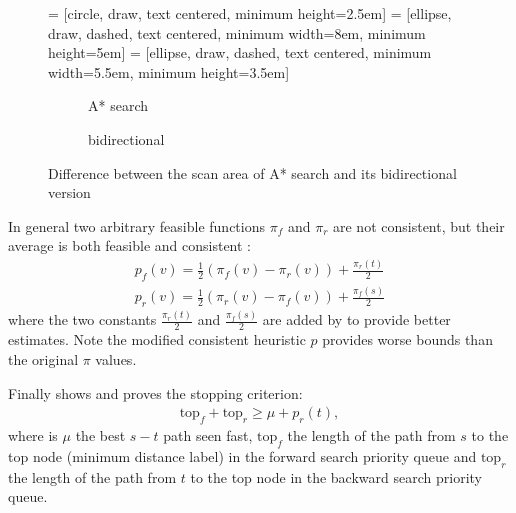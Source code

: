 \begin{figure}
     = [circle, draw, text centered, minimum height=2.5em]
     = [ellipse, draw, dashed, text centered, minimum width=8em, minimum height=5em]
     = [ellipse, draw, dashed, text centered, minimum width=5.5em, minimum height=3.5em]
    \centering
    \begin{subfigure}[t]{.4\textwidth}
        \centering
        \caption{A* search}
    \end{subfigure}
    \begin{subfigure}[t]{.4\textwidth}
        \centering
        \caption{bidirectional}
    \end{subfigure}
    \caption{Difference between the scan area of A* search and its bidirectional version}
    \label{fig:bidirectdiff}
\end{figure}
In general two arbitrary feasible functions $\pi_f$ and $\pi_r$ are not consistent, but their average is both feasible and consistent \citep{Ikeda}:
\begin{align}
    p_f(v) = \frac{1}{2}(\pi_f(v)-\pi_r(v)) + \frac{\pi_r(t)}{2} \\
    p_r(v) = \frac{1}{2}(\pi_r(v)-\pi_f(v)) + \frac{\pi_f(s)}{2} 
\end{align}
where the two constants $\frac{\pi_r(t)}{2}$ and $\frac{\pi_f(s)}{2}$ are added by \citet{GoldbergEPP} to provide better estimates.
Note the modified consistent heuristic $p$ provides worse bounds than the original $\pi$ values.

Finally \citet{GoldbergEPP} shows and proves the stopping criterion:
\begin{align}
    \text{top}_f + \text{top}_r \geq \mu + p_r(t),
\end{align}
where is $\mu$ the best $s-t$ path seen fast, $\text{top}_f$ the length of the path from $s$ to the top node (minimum distance label) in the forward search priority queue and $\text{top}_r$ the length of the path from $t$ to the top node in the backward search priority queue.

